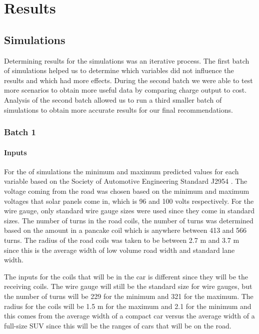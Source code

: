 
\renewcommand{\thechapter}{4}

\chapter{Results}

\section{Simulations}
\label{sec: s4.1}
Determining results for the simulations was an iterative process. The first batch of simulations helped us to 
determine which variables did not influence the results and which had more effects. During the second batch we were 
able to test more scenarios to obtain more useful data by comparing charge output to cost. Analysis of the second 
batch allowed us to run a third smaller batch of simulations to obtain more accurate results for our final 
recommendations.

\subsection{Batch 1}
\subsubsection{Inputs}
For the of simulations the minimum and maximum predicted values for each variable based on the Society of Automotive 
Engineering Standard J2954 \cite{noauthor_j2954_nodate}. The voltage coming from the road was chosen based on the minimum and 
maximum voltages that solar panels come in, which is 96 and 100 volts respectively.  For the wire gauge, only 
standard wire gauge sizes were used since they come in standard sizes. The number of turns in the road coils, 
the number of turns was determined based on the amount in a pancake coil which is anywhere between 413 and 566 turns. 
The radius of the road coils was taken to be between 2.7 m and 3.7 m since this is the average width of low volume 
road width and standard lane width. 

The inputs for the coils that will be in the car is different since they will be the receiving coils. 
The wire gauge will still be the standard size for wire gauges, but the number of turns will be 229 for the 
minimum and 321 for the maximum. The radius for the coils will be 1.5 m for the maximum and 2.1 for the minimum 
and this comes from the average width of a compact car versus the average width of a full-size SUV since this 
will be the ranges of cars that will be on the road. 

